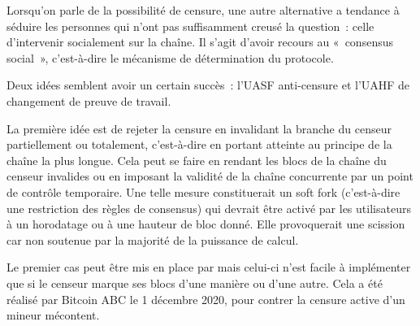 Lorsqu'on parle de la possibilité de censure, une autre alternative a tendance à séduire les personnes qui n'ont pas suffisamment creusé la question~: celle d'intervenir socialement sur la chaîne. Il s'agit d'avoir recours au «~consensus social~», c'est-à-dire le mécanisme de détermination du protocole.

Deux idées semblent avoir un certain succès~: l'UASF anti-censure et l'UAHF de changement de preuve de travail.


La première idée est de rejeter la censure en invalidant la branche du censeur partiellement ou totalement, c'est-à-dire en portant atteinte au principe de la chaîne la plus longue. Cela peut se faire en rendant les blocs de la chaîne du censeur invalides ou en imposant la validité de la chaîne concurrente par un point de contrôle temporaire. Une telle mesure constituerait un soft fork (c'est-à-dire une restriction des règles de consensus) qui devrait être activé par les utilisateurs à un horodatage ou à une hauteur de bloc donné. Elle provoquerait une scission car non soutenue par la majorité de la puissance de calcul.

Le premier cas peut être mis en place par mais celui-ci n'est facile à implémenter que si le censeur marque ses blocs d'une manière ou d'une autre. Cela a été réalisé par Bitcoin ABC le 1\ier{} décembre 2020, pour contrer la censure active d'un mineur mécontent.

